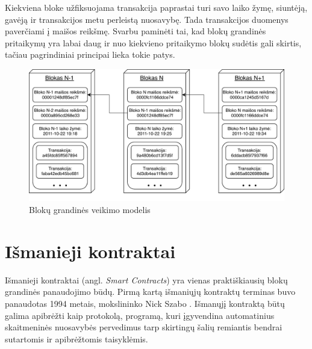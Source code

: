 \documentclass{VUMIFPSkursinis}
\begin{document}
Kiekviena bloke užfiksuojama transakcija paprastai turi savo laiko žymę, siuntėją, gavėją ir transakcijos metu perleistą nuosavybę. Tada transakcijos duomenys paverčiami į maišos reikšmę. Svarbu paminėti tai, kad blokų grandinės pritaikymų yra labai daug ir nuo kiekvieno pritaikymo blokų sudėtis gali skirtis, tačiau pagrindiniai principai lieka tokie patys.

\begin{figure}[H]
    \centering
    \includegraphics[scale=0.85]{img/pav-block-chain.pdf}
    \caption{Blokų grandinės veikimo modelis}
    \label{img:pav-block-chain}
\end{figure}

\section{Išmanieji kontraktai}
Išmanieji kontraktai (angl. \textit{Smart Contracts}) yra vienas praktiškiausių blokų grandinės panaudojimo būdų. Pirmą kartą išmaniųjų kontraktų terminas buvo panaudotas 1994 metais, mokslininko Nick Szabo \cite{szabo1994smart}. Išmanųjį kontraktą būtų galima apibrėžti kaip protokolą, programą, kuri įgyvendina automatinius skaitmeninės nuosavybės pervedimus tarp skirtingų šalių remiantis bendrai sutartomis ir apibrėžtomis taisyklėmis.
\end{document}
